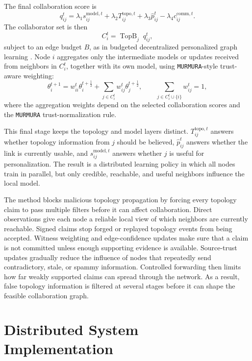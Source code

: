 \documentclass[journal]{IEEEtran}
\theoremstyle{definition}
\theoremstyle{remark}
\begin{document}
The final collaboration score is
\begin{equation}
q_{ij}^t =
\lambda_1 s_{ij}^{\text{model},t}
+ \lambda_2 T_{ij}^{\text{topo},t}
+ \lambda_3 \hat{p}_{ij}^t
- \lambda_4 c_{ij}^{\text{comm},t}.
\end{equation}
The collaborator set is then
\begin{equation}
C_i^t = \operatorname{TopB}_j \; q_{ij}^t,
\end{equation}
subject to an edge budget $B$, as in budgeted decentralized personalized graph learning \cite{kharrat2024decentralized}. Node $i$ aggregates only the intermediate models or updates received from neighbors in $C_i^t$, together with its own model, using \texttt{MURMURA}-style trust-aware weighting:
\begin{equation}
\theta_i^{t+1}
=
w_{ii}^t \theta_i^{t+\frac{1}{2}}
+
\sum_{j \in C_i^t} w_{ij}^t \theta_j^{t+\frac{1}{2}},
\qquad
\sum_{j \in C_i^t \cup \{i\}} w_{ij}^t = 1,
\end{equation}
where the aggregation weights depend on the selected collaboration scores and the \texttt{MURMURA} trust-normalization rule.

This final stage keeps the topology and model layers distinct. $T_{ij}^{\text{topo},t}$ answers whether topology information from $j$ should be believed, $\hat{p}_{ij}^t$ answers whether the link is currently usable, and $s_{ij}^{\text{model},t}$ answers whether $j$ is useful for personalization. The result is a distributed learning policy in which all nodes train in parallel, but only credible, reachable, and useful neighbors influence the local model.

The method blocks malicious topology propagation by forcing every topology claim to pass multiple filters before it can affect collaboration. Direct observations give each node a reliable local view of which neighbors are currently reachable. Signed claims stop forged or replayed topology events from being accepted. Witness weighting and edge-confidence updates make sure that a claim is not committed unless enough supporting evidence is available. Source-trust updates gradually reduce the influence of nodes that repeatedly send contradictory, stale, or spammy information. Controlled forwarding then limits how far weakly supported claims can spread through the network.
 As a result, false topology information is filtered at several stages before it can shape the feasible collaboration graph.

\section{Distributed System Implementation}
\label{sec:implementation}
\end{document}
